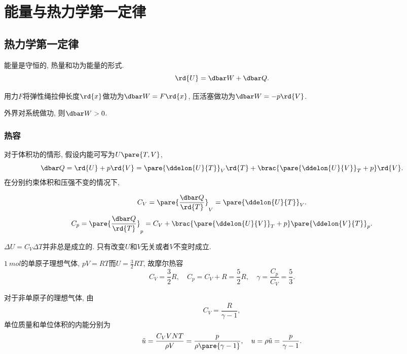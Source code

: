 \documentclass[../Thermal.tex]{subfiles}
\begin{document}
\section{能量与热力学第一定律}
\subsection{热力学第一定律}
\begin{finale}
\begin{axiom}[热力学第一定律]
能量是守恒的, 热量和功为能量的形式.
\[ \rd{U} = \dbar W + \dbar Q. \]
\end{axiom}
\end{finale}
\begin{ex}
用力$F$将弹性绳拉伸长度$\rd{x}$做功为$\dbar W = F\rd{x}$, 压活塞做功为$\dbar W = -p\rd{V}$. 
\end{ex}
\begin{finale}
外界对系统做功, 则$\dbar W>0$.
\end{finale}
\subsubsection{热容}
对于体积功的情形, 假设内能可写为$U\pare{T,V}$,
\[ \dbar Q = \rd{U} + p\rd{V} = \pare{\ddelon{U}{T}}_V \rd{T} + \brac{\pare{\ddelon{U}{V}}_T + p} \rd{V}. \]
在分别约束体积和压强不变的情况下,
\begin{finale}
\[ C_V = \pare{\frac{\dbar Q}{\rd{T}}}_V = \pare{\ddelon{U}{T}}_V. \]
\[ C_p = \pare{\frac{\dbar Q}{\rd{T}}}_p = C_V + \brac{\pare{\ddelon{U}{V}}_T + p}\pare{\ddelon{V}{T}}_p. \]
\end{finale}
\begin{pitfall}
$\Delta U = C_V\Delta{T}$并非总是成立的. 只有改变$U$和$V$无关或者$V$不变时成立.
\end{pitfall}
\begin{ex}
$\SI{1}{mol}$的单原子理想气体, $pV = RT$而$U = \frac{3}{2}RT$, 故摩尔热容
\[ C_V = \frac{3}{2} R, \quad C_p = C_V + R = \frac{5}{2} R, \quad \gamma = \frac{C_p}{C_V} = \frac{5}{3}. \]
\end{ex}
\begin{ex}
对于非单原子的理想气体, 由
\[ C_V = \frac{R}{\gamma - 1}, \]
单位质量和单位体积的内能分别为
\begin{equation}
\label{eq:uinpandgamma}
\tilde{u} = \frac{C_V VNT}{\rho V} = \frac{p}{\rho\pare{\gamma - 1}}, \quad u = \rho\tilde{u} = \frac{p}{\gamma - 1}.
\end{equation}
\end{ex}
\end{document}
